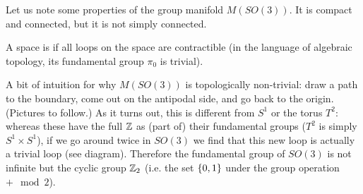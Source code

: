 Let us note some properties of the group manifold $M(SO(3))$. It is compact and connected, but it is not simply connected.
\begin{defn}
A space is  if all loops on the space are contractible (in the language of algebraic topology, its fundamental group $\pi_0$ is trivial).
\end{defn}
A bit of intuition for why $M(SO(3))$ is topologically non-trivial: draw a path to the boundary, come out on the antipodal side, and go back to the origin. (Pictures to follow.) As it turns out, this is different from $S^1$ or the torus $T^2$: whereas these have the full $\mathbb{Z}$ as (part of) their fundamental groups ($T^2$ is simply $S^1\times S^1$), if we go around twice in $SO(3)$ we find that this new loop is actually a trivial loop (see diagram). Therefore the fundamental group of $SO(3)$ is not infinite but the cyclic group $\mathbb{Z}_2$ (i.e. the set $\{0,1\}$ under the group operation $+\mod 2$).